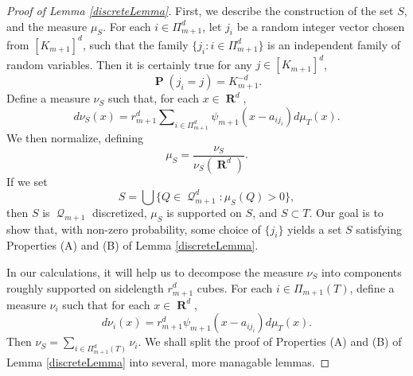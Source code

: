 \documentclass[12pt,reqno]{article}
\numberwithin{equation}{section}
\DeclareMathOperator{\RR}{\mathbf{R}}
\DeclareMathOperator{\PP}{\mathbf{P}}
\DeclareMathOperator{\DQ}{\mathcal{Q}}
\begin{document}
\begin{proof}[Proof of Lemma \ref{discreteLemma}]
    \renewcommand{\qedsymbol}{}
    First, we describe the construction of the set $S$, and the measure $\mu_S$. For each $i \in \Pi_{m+1}^d$, let $j_i$ be a random integer vector chosen from $[K_{m+1}]^d$, such that the family $\{ j_i : i \in \Pi_{m+1}^d \}$ is an independent family of random variables. Then it is certainly true for any $j \in [K_{m+1}]^d$,
    \begin{equation} \label{equation129412904912090}
        \PP(j_i = j) = K_{m+1}^{-d}.
    \end{equation}
    Define a measure $\nu_S$ such that, for each $x \in \RR^d$,
    \[ d\nu_S(x) = r_{m+1}^d \sum\nolimits_{i \in \Pi_{m+1}^d} \psi_{m+1}(x - a_{ij_i}) d\mu_T(x). \]
    We then normalize, defining
    \[ \mu_S = \frac{\nu_S}{\nu_S(\RR^d)}. \]
    If we set
    \[ S = \bigcup \{ Q \in \DQ_{m+1}^d : \mu_S(Q) > 0 \}, \]
    then $S$ is $\DQ_{m+1}$ discretized, $\mu_S$ is supported on $S$, and $S \subset T$. Our goal is to show that, with non-zero probability, some choice of $\{ j_i \}$ yields a set $S$ satisfying Properties (A) and (B) of Lemma \ref{discreteLemma}.

    In our calculations, it will help us to decompose the measure $\nu_S$ into components roughly supported on sidelength $r_{m+1}^d$ cubes. For each $i \in \Pi_{m+1}(T)$, define a measure $\nu_i$ such that for each $x \in \RR^d$,
    \[ d\nu_i(x) = r_{m+1}^d \psi_{m+1}(x - a_{ij_i}) d\mu_T(x). \]
    Then $\nu_S = \sum_{i \in \Pi_{m+1}^d(T)} \nu_i$. We shall split the proof of Properties (A) and (B) of Lemma \ref{discreteLemma} into several, more managable lemmas.
\end{proof}
\end{document}
